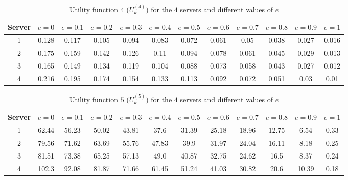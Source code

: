\begin{table}[H]
    \caption{Utility function \(4\) (\(U_k^{(4)}\)) for the \(4\) servers and
    different values of \(e\)}
    \label{tab:case_study_utility_4_all_servers}
    \begin{adjustbox}{width=\columnwidth,center}
        \begin{tabular}{|c|c|c|c|c|c|c|c|c|c|c|c|}
            \hline
            Server & \(e = 0\) & \(e = 0.1\) & \(e = 0.2\) & \(e = 0.3\)
                   & \(e = 0.4\) & \(e = 0.5\) & \(e = 0.6\) & \(e = 0.7\)
                   & \(e = 0.8\) & \(e = 0.9\) & \(e = 1\) \\
            \hline
            1 & 0.128 & 0.117 & 0.105 & 0.094 & 0.083 & 0.072 & 0.061 & 0.05
            & 0.038 & 0.027 & 0.016 \\
            2 & 0.175 & 0.159 & 0.142 & 0.126 & 0.11 & 0.094 & 0.078 & 0.061
            & 0.045 & 0.029 & 0.013 \\
            3 & 0.165 & 0.149 & 0.134 & 0.119 & 0.104 & 0.088 & 0.073 & 0.058
            & 0.043 & 0.027 & 0.012 \\
            4 & 0.216 & 0.195 & 0.174 & 0.154 & 0.133 & 0.113 & 0.092 & 0.072
            & 0.051 & 0.03 & 0.01 \\            
            \hline
        \end{tabular}
    \end{adjustbox}
\end{table}

\begin{table}[H]
    \caption{Utility function \(5\) (\(U_k^{(5)}\)) for the \(4\) servers and
    different values of \(e\)}
    \label{tab:case_study_utility_5_all_servers}
    \begin{adjustbox}{width=\columnwidth,center}
        \begin{tabular}{|c|c|c|c|c|c|c|c|c|c|c|c|}
            \hline
            Server & \(e = 0\) & \(e = 0.1\) & \(e = 0.2\) & \(e = 0.3\)
                   & \(e = 0.4\) & \(e = 0.5\) & \(e = 0.6\) & \(e = 0.7\)
                   & \(e = 0.8\) & \(e = 0.9\) & \(e = 1\) \\
            \hline
            1 & 62.44 & 56.23 & 50.02 & 43.81 & 37.6 & 31.39 & 25.18 & 18.96 &
            12.75 & 6.54 & 0.33 \\
            2 & 79.56 & 71.62 & 63.69 & 55.76 & 47.83 & 39.9 & 31.97 & 24.04
            & 16.11 & 8.18 & 0.25 \\
            3 & 81.51 & 73.38 & 65.25 & 57.13 & 49.0 & 40.87 & 32.75 & 24.62
            & 16.5 & 8.37 & 0.24 \\
            4 & 102.3 & 92.08 & 81.87 & 71.66 & 61.45 & 51.24 & 41.03 & 30.82
            & 20.6 & 10.39 & 0.18 \\
            \hline
        \end{tabular}
    \end{adjustbox}
\end{table}

